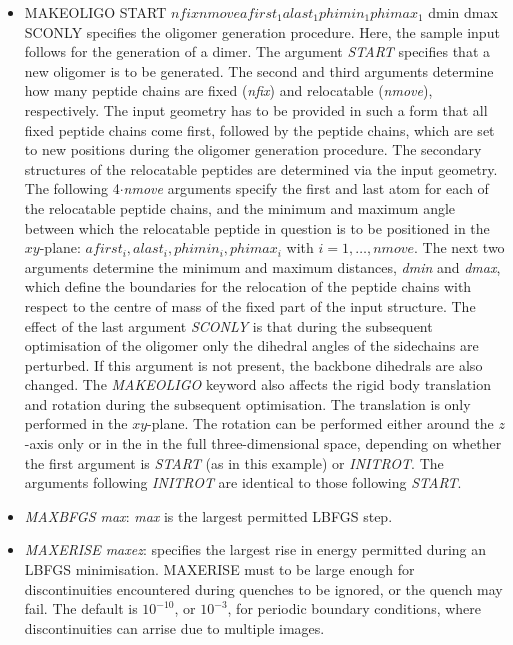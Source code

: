 \documentclass[12pt,a4paper,dvips]{article}
\begin{document}
\begin{itemize}
\item MAKEOLIGO START $nfix nmove afirst_1 alast_1 phimin_1 phimax_1$ dmin dmax SCONLY
specifies the oligomer generation procedure. Here, the sample input follows for the generation of a dimer.
The argument \textit{START} specifies that a new oligomer is to be generated.
The second and third arguments determine how many peptide chains are fixed ({\it nfix}) and relocatable ({\it nmove}), respectively.
The input geometry has
to be provided in such a form that all fixed peptide chains come first, followed by the peptide chains,
which are set to
new positions during the oligomer generation procedure. The secondary structures of the relocatable peptides are determined via the input
geometry. The following 4$\cdot${\it nmove} arguments specify the first and last atom for each of the relocatable peptide chains, and the
minimum and maximum angle between which the relocatable peptide in question is to be positioned in the $xy$-plane:
$afirst_i, alast_i, phimin_i, phimax_i$ with $i=1,\ldots,nmove$.
The next two arguments determine the minimum and maximum distances, {\it dmin} and {\it dmax}, which define the boundaries
for the relocation of the peptide chains with respect to the centre of mass of the fixed part of the input structure.
The effect of the last argument \textit{SCONLY} is that during the subsequent optimisation of the oligomer only the dihedral angles
of the sidechains are perturbed. If this argument is not present, the backbone dihedrals are also changed.
The \textit{MAKEOLIGO} keyword also affects the rigid body translation and rotation during the subsequent optimisation. The translation is
only performed in the $xy$-plane. The rotation can be performed either around the $z$-axis only or in the in the full three-dimensional
space, depending on whether the first argument is \textit{START} (as in this example) or \textit{INITROT}. The arguments following
\textit{INITROT} are identical to those following \textit{START}.

\item {\it MAXBFGS max\/}: {\it max\/} is the largest permitted LBFGS step.

\item {\it MAXERISE maxez\/}: specifies the largest rise in energy permitted during an LBFGS 
minimisation.  MAXERISE must to be large enough for discontinuities encountered
during quenches to be ignored, or the quench may fail.  The default is
$10^{-10}$, or $10^{-3}$, for periodic boundary conditions, where
discontinuities can arrise due to multiple images.


\end{itemize}
\end{document}
